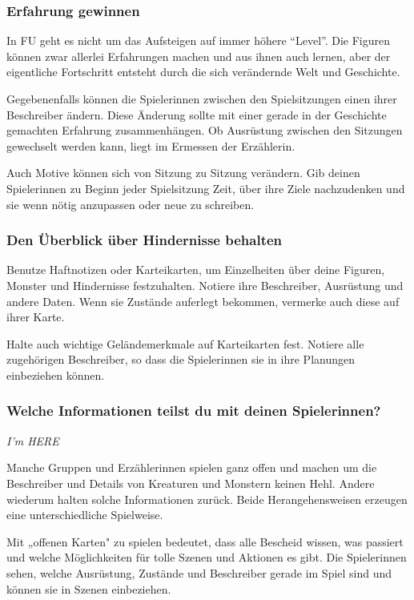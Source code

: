 \documentclass[]{article}
\begin{document}
\subsubsection{Erfahrung gewinnen}\label{erfahrung-gewinnen}

In FU geht es nicht um das Aufsteigen auf immer höhere ``Level''. Die
Figuren können zwar allerlei Erfahrungen machen und aus ihnen auch
lernen, aber der eigentliche Fortschritt entsteht durch die sich
verändernde Welt und Geschichte.

Gegebenenfalls können die Spielerinnen zwischen den Spielsitzungen einen
ihrer Beschreiber ändern. Diese Änderung sollte mit einer gerade in der
Geschichte gemachten Erfahrung zusammenhängen. Ob Ausrüstung zwischen
den Sitzungen gewechselt werden kann, liegt im Ermessen der Erzählerin.

Auch Motive können sich von Sitzung zu Sitzung verändern. Gib deinen
Spielerinnen zu Beginn jeder Spielsitzung Zeit, über ihre Ziele
nachzudenken und sie wenn nötig anzupassen oder neue zu schreiben.

\subsubsection{Den Überblick über Hindernisse
behalten}\label{den-uxfcberblick-uxfcber-hindernisse-behalten}

Benutze Haftnotizen oder Karteikarten, um Einzelheiten über deine
Figuren, Monster und Hindernisse festzuhalten. Notiere ihre Beschreiber,
Ausrüstung und andere Daten. Wenn sie Zustände auferlegt bekommen,
vermerke auch diese auf ihrer Karte.

Halte auch wichtige Geländemerkmale auf Karteikarten fest. Notiere alle
zugehörigen Beschreiber, so dass die Spielerinnen sie in ihre Planungen
einbeziehen können.

\subsubsection{Welche Informationen teilst du mit deinen
Spielerinnen?}\label{welche-informationen-teilst-du-mit-deinen-spielerinnen}

\emph{I'm HERE}

Manche Gruppen und Erzählerinnen spielen ganz offen und machen um die
Beschreiber und Details von Kreaturen und Monstern keinen Hehl. Andere
wiederum halten solche Informationen zurück. Beide Herangehensweisen
erzeugen eine unterschiedliche Spielweise.

Mit „offenen Karten" zu spielen bedeutet, dass alle Bescheid wissen, was
passiert und welche Möglichkeiten für tolle Szenen und Aktionen es gibt.
Die Spielerinnen sehen, welche Ausrüstung, Zustände und Beschreiber
gerade im Spiel sind und können sie in Szenen einbeziehen.
\end{document}
